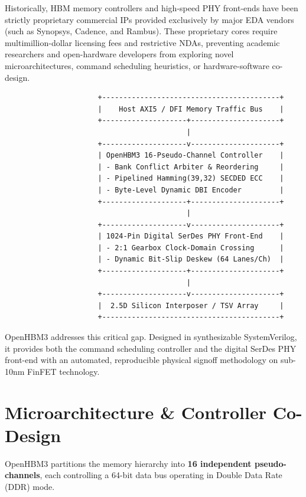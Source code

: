 \documentclass[journal,10pt,twocolumn]{IEEEtran}
\begin{document}
Historically, HBM memory controllers and high-speed PHY front-ends have been strictly proprietary commercial IPs provided exclusively by major EDA vendors (such as Synopsys, Cadence, and Rambus). These proprietary cores require multimillion-dollar licensing fees and restrictive NDAs, preventing academic researchers and open-hardware developers from exploring novel microarchitectures, command scheduling heuristics, or hardware-software co-design.

\begin{footnotesize}\begin{verbatim}
                      +------------------------------------------+
                      |    Host AXI5 / DFI Memory Traffic Bus    |
                      +--------------------+---------------------+
                                           |
                      +--------------------v---------------------+
                      | OpenHBM3 16-Pseudo-Channel Controller    |
                      | - Bank Conflict Arbiter & Reordering     |
                      | - Pipelined Hamming(39,32) SECDED ECC    |
                      | - Byte-Level Dynamic DBI Encoder         |
                      +--------------------+---------------------+
                                           |
                      +--------------------v---------------------+
                      | 1024-Pin Digital SerDes PHY Front-End    |
                      | - 2:1 Gearbox Clock-Domain Crossing      |
                      | - Dynamic Bit-Slip Deskew (64 Lanes/Ch)  |
                      +--------------------+---------------------+
                                           |
                      +--------------------v---------------------+
                      |  2.5D Silicon Interposer / TSV Array     |
                      +------------------------------------------+
\end{verbatim}\end{footnotesize}

OpenHBM3 addresses this critical gap. Designed in synthesizable SystemVerilog, it provides both the command scheduling controller and the digital SerDes PHY front-end with an automated, reproducible physical signoff methodology on sub-10nm FinFET technology.


\section{Microarchitecture \& Controller Co-Design}

OpenHBM3 partitions the memory hierarchy into \textbf{16 independent pseudo-channels}, each controlling a 64-bit data bus operating in Double Data Rate (DDR) mode.
\end{document}
